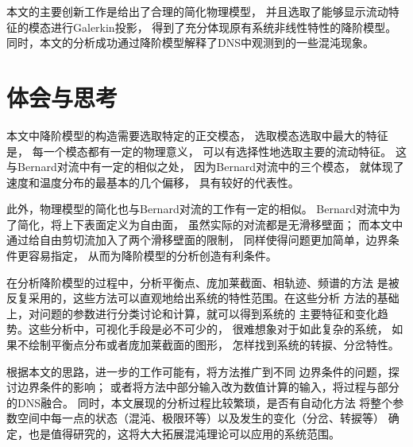 \documentclass[UTF8,zihao=5]{ctexart} %
\begin{document}
本文的主要创新工作是给出了合理的简化物理模型，
并且选取了能够显示流动特征的模态进行Galerkin投影，
得到了充分体现原有系统非线性特性的降阶模型。
同时，本文的分析成功通过降阶模型解释了DNS中观测到的一些混沌现象。

\section{体会与思考}
本文中降阶模型的构造需要选取特定的正交模态，
选取模态选取中最大的特征是，
每一个模态都有一定的物理意义，
可以有选择性地选取主要的流动特征。
这与Bernard对流中有一定的相似之处，
因为Bernard对流中的三个模态，
就体现了速度和温度分布的最基本的几个偏移，
具有较好的代表性。

此外，物理模型的简化也与Bernard对流的工作有一定的相似。
Bernard对流中为了简化，将上下表面定义为自由面，
虽然实际的对流都是无滑移壁面；
而本文中通过给自由剪切流加入了两个滑移壁面的限制，
同样使得问题更加简单，边界条件更容易指定，
从而为降阶模型的分析创造有利条件。

在分析降阶模型的过程中，分析平衡点、庞加莱截面、相轨迹、频谱的方法
是被反复采用的，这些方法可以直观地给出系统的特性范围。在这些分析
方法的基础上，对问题的参数进行分类讨论和计算，就可以得到系统的
主要特征和变化趋势。这些分析中，可视化手段是必不可少的，
很难想象对于如此复杂的系统，
如果不绘制平衡点分布或者庞加莱截面的图形，
怎样找到系统的转捩、分岔特性。

根据本文的思路，进一步的工作可能有，将方法推广到不同
边界条件的问题，探讨边界条件的影响；
或者将方法中部分输入改为数值计算的输入，将过程与部分的DNS融合。
同时，本文展现的分析过程比较繁琐，是否有自动化方法
将整个参数空间中每一点的状态（混沌、极限环等）以及发生的变化（分岔、转捩等）
确定，也是值得研究的，这将大大拓展混沌理论可以应用的系统范围。


{}


\end{document}
